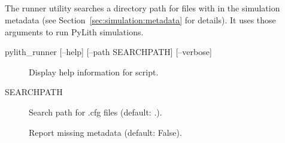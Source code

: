 \subsection{}

The runner utility searches a directory path for  files with  in the simulation metadata (see Section~\vref{sec:simulation:metadata} for details).
It uses those arguments to run PyLith simulations.


\begin{shell}
pylith_runner [--help] [--path SEARCHPATH] [--verbose]
\end{shell}

\begin{description}
\item[] Display help information for script.
\item[ SEARCHPATH] Search path for .cfg files (default: .).
\item[] Report missing metadata (default: False).
\end{description}



\subsection{}

